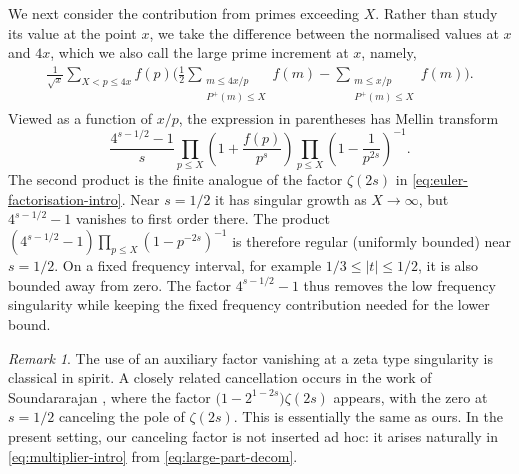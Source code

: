 \documentclass[a4paper,12pt,reqno]{amsart}
\numberwithin{equation}{section}
\theoremstyle{remark}
\newtheorem{remark}[theorem]{Remark}
\begin{document}
We next consider the contribution from primes exceeding \(X\). Rather than
study its value at the point $x$, we take the difference between the
normalised values at \(x\) and \(4x\), which we also call the large prime increment at \(x\), namely,
\begin{align}\label{eq:large-part-decom}
 \frac{1}{\sqrt x}\sum_{X<p\leq4x}f(p)
 \Bigg(
 \frac12
 \sum_{\substack{m\leq4x/p\\P^+(m)\leq X}}f(m)
 -
 \sum_{\substack{m\leq x/p\\P^+(m)\leq X}}f(m)
 \Bigg).
\end{align}
Viewed as a function of \(x/p\), the expression in parentheses has
Mellin transform
\begin{equation}\label{eq:multiplier-intro}
 \frac{4^{s-1/2}-1}{s}
 \prod_{p\leq X}\left(1+\frac{f(p)}{p^s}\right)
 \prod_{p\leq X}\left(1-\frac{1}{p^{2s}}\right)^{-1}.
\end{equation}
The second product is the finite analogue of the factor \(\zeta(2s)\) in
\eqref{eq:euler-factorisation-intro}. Near \(s=1/2\) it has singular
growth as \(X\to\infty\), but \(4^{s-1/2}-1\) vanishes to first order there.
The product
\(
 \left(4^{s-1/2}-1\right)
 \prod_{p\leq X}\left(1-{p^{-2s}}\right)^{-1}
\)
is therefore  regular (uniformly bounded) near \(s=1/2\). On a fixed frequency
interval, for example \(1/3\leq |t|\leq1/2\), it is also bounded away from
zero. The factor $4^{s-1/2}-1$  thus removes the low frequency singularity while keeping the fixed frequency contribution needed for the lower bound.

\begin{remark}
The use of an auxiliary factor vanishing at a zeta type singularity is
classical in spirit. 
A closely related cancellation occurs in the work of Soundararajan \cite[Section~5.3]{Soundararajan2000}, where the factor
\(
 \bigl(1-2^{1-2s}\bigr)\zeta(2s)
\)
appears, with the zero at \(s=1/2\) canceling the pole of
\(\zeta(2s)\).  This is essentially the same as ours.
In the present setting, our canceling factor is not inserted ad hoc: it arises naturally in \eqref{eq:multiplier-intro} from \eqref{eq:large-part-decom}.
\end{remark}
\end{document}
